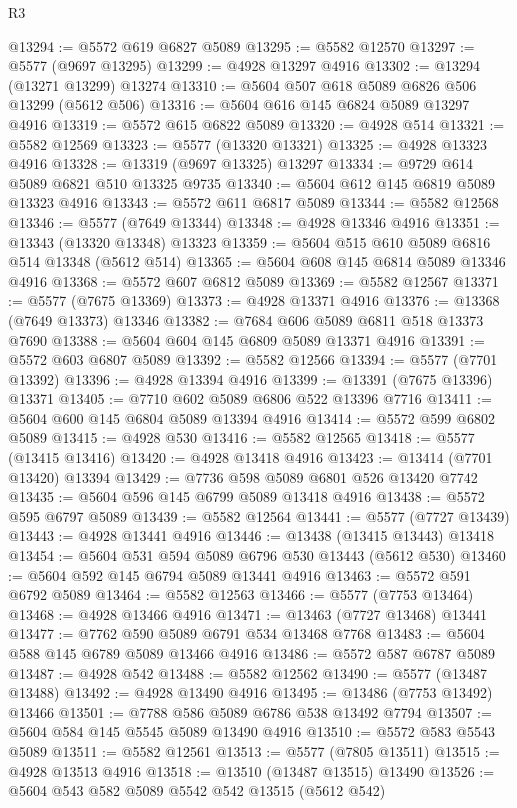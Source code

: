 \begin{lexlean}{R3}
\begin{coremodule}
@13294 := @5572 @619 @6827 @5089
@13295 := @5582 @12570
@13297 := @5577 (@9697 @13295)
@13299 := @4928 @13297 @4916
@13302 := @13294 (@13271 @13299) @13274
@13310 := @5604 @507 @618 @5089 @6826 @506 @13299 (@5612 @506)
@13316 := @5604 @616 @145 @6824 @5089 @13297 @4916
@13319 := @5572 @615 @6822 @5089
@13320 := @4928 @514
@13321 := @5582 @12569
@13323 := @5577 (@13320 @13321)
@13325 := @4928 @13323 @4916
@13328 := @13319 (@9697 @13325) @13297
@13334 := @9729 @614 @5089 @6821 @510 @13325 @9735
@13340 := @5604 @612 @145 @6819 @5089 @13323 @4916
@13343 := @5572 @611 @6817 @5089
@13344 := @5582 @12568
@13346 := @5577 (@7649 @13344)
@13348 := @4928 @13346 @4916
@13351 := @13343 (@13320 @13348) @13323
@13359 := @5604 @515 @610 @5089 @6816 @514 @13348 (@5612 @514)
@13365 := @5604 @608 @145 @6814 @5089 @13346 @4916
@13368 := @5572 @607 @6812 @5089
@13369 := @5582 @12567
@13371 := @5577 (@7675 @13369)
@13373 := @4928 @13371 @4916
@13376 := @13368 (@7649 @13373) @13346
@13382 := @7684 @606 @5089 @6811 @518 @13373 @7690
@13388 := @5604 @604 @145 @6809 @5089 @13371 @4916
@13391 := @5572 @603 @6807 @5089
@13392 := @5582 @12566
@13394 := @5577 (@7701 @13392)
@13396 := @4928 @13394 @4916
@13399 := @13391 (@7675 @13396) @13371
@13405 := @7710 @602 @5089 @6806 @522 @13396 @7716
@13411 := @5604 @600 @145 @6804 @5089 @13394 @4916
@13414 := @5572 @599 @6802 @5089
@13415 := @4928 @530
@13416 := @5582 @12565
@13418 := @5577 (@13415 @13416)
@13420 := @4928 @13418 @4916
@13423 := @13414 (@7701 @13420) @13394
@13429 := @7736 @598 @5089 @6801 @526 @13420 @7742
@13435 := @5604 @596 @145 @6799 @5089 @13418 @4916
@13438 := @5572 @595 @6797 @5089
@13439 := @5582 @12564
@13441 := @5577 (@7727 @13439)
@13443 := @4928 @13441 @4916
@13446 := @13438 (@13415 @13443) @13418
@13454 := @5604 @531 @594 @5089 @6796 @530 @13443 (@5612 @530)
@13460 := @5604 @592 @145 @6794 @5089 @13441 @4916
@13463 := @5572 @591 @6792 @5089
@13464 := @5582 @12563
@13466 := @5577 (@7753 @13464)
@13468 := @4928 @13466 @4916
@13471 := @13463 (@7727 @13468) @13441
@13477 := @7762 @590 @5089 @6791 @534 @13468 @7768
@13483 := @5604 @588 @145 @6789 @5089 @13466 @4916
@13486 := @5572 @587 @6787 @5089
@13487 := @4928 @542
@13488 := @5582 @12562
@13490 := @5577 (@13487 @13488)
@13492 := @4928 @13490 @4916
@13495 := @13486 (@7753 @13492) @13466
@13501 := @7788 @586 @5089 @6786 @538 @13492 @7794
@13507 := @5604 @584 @145 @5545 @5089 @13490 @4916
@13510 := @5572 @583 @5543 @5089
@13511 := @5582 @12561
@13513 := @5577 (@7805 @13511)
@13515 := @4928 @13513 @4916
@13518 := @13510 (@13487 @13515) @13490
@13526 := @5604 @543 @582 @5089 @5542 @542 @13515 (@5612 @542)

\end{coremodule}
\end{lexlean}

